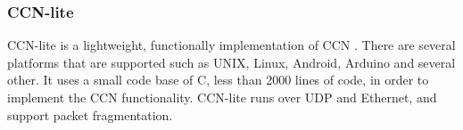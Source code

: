 % 




\subsubsection{CCN-lite}
CCN-lite is a lightweight, functionally implementation of CCN \cite{CCN-LITE}. There are several platforms that are supported such as UNIX, Linux, Android, Arduino and several other. It uses a small code base of C, less than 2000 lines of code, in order to implement the CCN functionality. CCN-lite runs over UDP and Ethernet, and support packet fragmentation.
\\




















